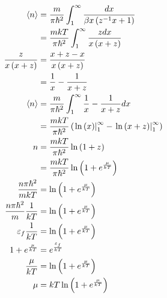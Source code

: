 \documentclass{report}
\begin{document}
\begin{align*}
  \left<n\right> &= \frac{m}{\pi\hbar^2} \int_1^\infty \frac{dx}{\beta x\left(z^{-1}x + 1\right)}\\
  &= \frac{m k T}{\pi \hbar^2} \int_1^\infty \frac{zdx}{x\left(x + z\right)}\\
  \frac{z}{x\left(x + z\right)} &= \frac{x + z - x}{x\left(x + z\right)}\\
  &= \frac{1}{x} - \frac{1}{x + z}\\
  \left<n\right> &= \frac{m}{\pi\hbar^2}\int_1^\infty \frac{1}{x} - \frac{1}{x + z} dx \\
  &= \frac{mkT}{\pi\hbar^2} \left(\left.\ln\left(x\right)\right|_1^\infty - \left.\ln\left(x + z\right)\right|_1^\infty\right)\\
  n &= \frac{mkT}{\pi\hbar^2}\ln\left(1 + z\right)\\
  &= \frac{mkT}{\pi\hbar^2}\ln\left(1 + e^{\frac{\mu}{kT}}\right)\\
  \frac{n\pi\hbar^2}{mkT} &=\ln\left(1 + e^{\frac{\mu}{kT}}\right)\\
  \frac{n\pi\hbar^2}{m}\frac{1}{kT} &=\ln\left(1 + e^{\frac{\mu}{kT}}\right)\\
  \varepsilon_f\frac{1}{kT} &=\ln\left(1 + e^{\frac{\mu}{kT}}\right)\\
  1 + e^{\frac{\mu}{kT}} &= e^{\frac{\varepsilon_f}{kT}}\\
  \frac{\mu}{kT} &= \ln\left(1 + e^{\frac{\mu}{kT}}\right)\\
  \mu &= kT \ln\left(1 + e^{\frac{\mu}{kT}}\right)
\end{align*}
\end{document}
